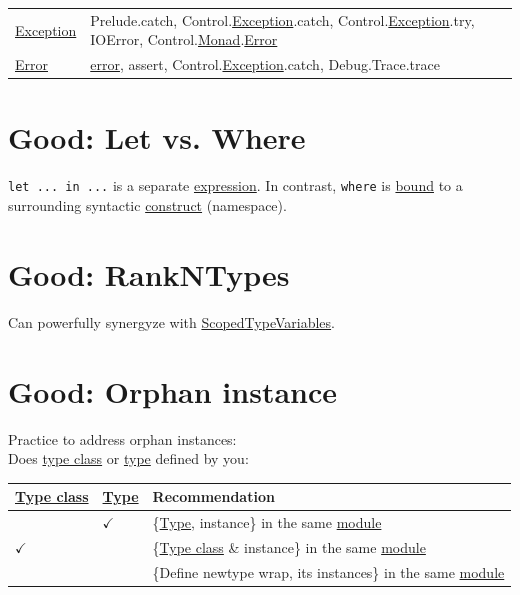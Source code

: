 \documentclass[a4paper,14pt,oneside]{book}
\begin{document}
\begin{center}
\begin{tabular}{ll}
\hline
\hyperref[org4a5dbbf]{Exception} & Prelude.catch, Control.\hyperref[org4a5dbbf]{Exception}.catch, Control.\hyperref[org4a5dbbf]{Exception}.try, IOError, Control.\hyperref[org0668aa4]{Monad}.\hyperref[org7949068]{Error}\\
\hyperref[org7949068]{Error} & \hyperref[org7949068]{error}, assert, Control.\hyperref[org4a5dbbf]{Exception}.catch, Debug.Trace.trace\\
\end{tabular}
\end{center}

\chapter{\label{orgd014a4f}Good: Let vs. Where}
\label{sec:org5868772}
\texttt{let ... in ...} is a separate \hyperref[orgc13c7cc]{expression}. In contrast, \texttt{where} is \hyperref[org48a33ea]{bound} to a surrounding syntactic \hyperref[org443bd43]{construct} (namespace).\\

\chapter{\label{orgfb744c5}Good: RankNTypes}
\label{sec:org599bc25}
Can powerfully synergyze with \hyperref[org2b8d23c]{ScopedTypeVariables}.\\

\chapter{\label{org4839a71}Good: Orphan instance}
\label{sec:orgff0d7aa}
Practice to address orphan instances:\\

Does \hyperref[orga93281c]{type class} or \hyperref[orga286a54]{type} defined by you:\\
\begin{center}
\begin{tabular}{lll}
\hyperref[orga93281c]{Type class} & \hyperref[orga286a54]{Type} & Recommendation\\
\hline
 & \(\checkmark\) & \{\hyperref[orga286a54]{Type}, instance\} in the same \hyperref[orgeceaa2e]{module}\\
\(\checkmark\) &  & \{\hyperref[orga93281c]{Type class} \& instance\} in the same \hyperref[orgeceaa2e]{module}\\
 &  & \{Define newtype wrap, its instances\} in the same \hyperref[orgeceaa2e]{module}\\
\end{tabular}
\end{center}
\end{document}

